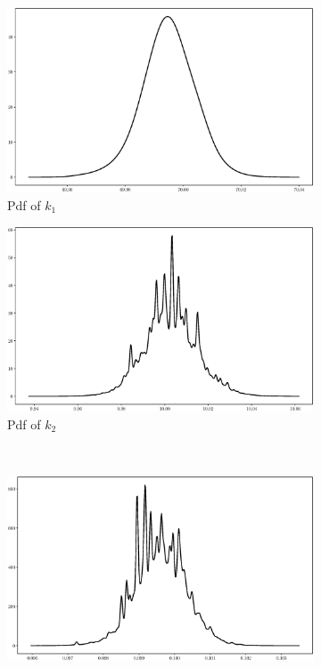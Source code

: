 \documentclass[]{elsarticle}
\begin{document}
\begin{figure}[!htb]
\centering
\begin{subfigure}{.49\textwidth}
  \centering
\includegraphics[width=\linewidth,keepaspectratio]{./figs/Case00/Model1_k1.eps}
\caption{Pdf of $k_1$}
\label{fig:s1a}
\end{subfigure}
\begin{subfigure}{.49\textwidth}
  \centering
\includegraphics[width=\linewidth,keepaspectratio]{./figs/Case00/Model1_k2.eps}
\caption{Pdf of $k_2$}
\label{fig:s1b}
\end{subfigure}\\
\begin{subfigure}{.49\textwidth}
  \centering
\includegraphics[width=\linewidth,keepaspectratio]{./figs/Case00/Model1_c.eps}

\end{subfigure}
\end{figure}
\end{document}
